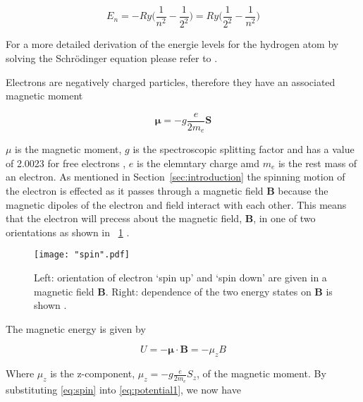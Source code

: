\documentclass{article}
\newcommand{\figref}[2][\figurename~]{#1\ref{#2}}
\newcommand{\secref}[2][Section~]{#1\ref{#2}}
\begin{document}
\begin{equation}
\label{eq:balmer-series}
E_n = -Ry\Bigg(\frac{1}{n^2} - \frac{1}{2^2}\Bigg) = Ry\Bigg(\frac{1}{2^2} - \frac{1}{n^2}\Bigg)
\end{equation}

\vspace{2mm}
\noindent
For a more detailed derivation of the energie levels for the hydrogen atom by solving the Schr\"{o}dinger equation please refer to \cite{Book02}.

\vspace{2mm}
\noindent
Electrons are negatively charged particles, therefore they have an associated magnetic moment

\begin{equation}
\label{eq:magnetic-moment}
\boldsymbol{\mu} = -g\frac{e}{2m_e}\textbf{S}
\end{equation}

\vspace{2mm}
\noindent
\textbf{$\mu$} is the magnetic moment, $g$ is the spectroscopic splitting factor and has a value of 2.0023 for free electrons \cite{Paper02}, $e$ is the elemntary charge amd $m_e$ is the rest mass of an electron. As mentioned in \secref{sec:introduction} the spinning motion of the electron is effected as it passes through a magnetic field \textbf{B} because the magnetic dipoles of the electron and field interact with each other. This means that the electron will precess about the magnetic field, \textbf{B}, in one of two orientations as shown in \figref{fig:spin} \cite{Paper02}.

\begin{figure}[h]
\centering
\texttt{[image: "spin".pdf]}
\caption{Left: orientation of electron `spin up' and `spin down' are given in a magnetic field \textbf{B}. Right: dependence of the two energy states on \textbf{B} is shown \cite{Paper02}.}
\label{fig:spin}
\end{figure}

\newpage
\vspace{2mm}
\noindent
The magnetic energy is given by \cite{Paper02}

\begin{equation}
\label{eq:potential1}
U = -\boldsymbol{\mu} \cdot \textbf{B} = - \mu_zB
\end{equation}

\vspace{2mm}
\noindent
Where $\mu_z$ is the z-component, $\mu_z = -g\frac{e}{2m_e}S_z$, of the magnetic moment. By substituting \eqref{eq:spin} into \eqref{eq:potential1}, we now have
\end{document}
